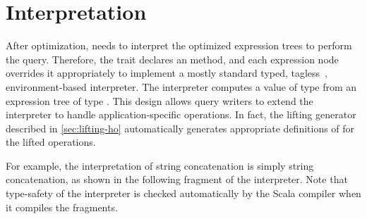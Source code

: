 %
%
%
%
%
%
\section{Interpretation}
\label{sec:interpretation}

After optimization, {\LoS} needs to interpret the optimized expression trees to perform the query. Therefore, the trait  declares an  method, and each expression node overrides it appropriately to implement a mostly standard typed, tagless~\citep{carette09finally}, environment-based interpreter. The interpreter computes a value of type  from an expression tree of type . This design allows query writers to extend the interpreter to handle application-specific operations. In fact, the lifting generator described in \cref{sec:lifting-ho} automatically generates appropriate definitions of  for the lifted operations. 

For example, the interpretation of string concatenation is simply string concatenation, as shown in the following fragment of the interpreter. Note that type-safety of the interpreter is checked automatically by the Scala compiler when it compiles the fragments.

